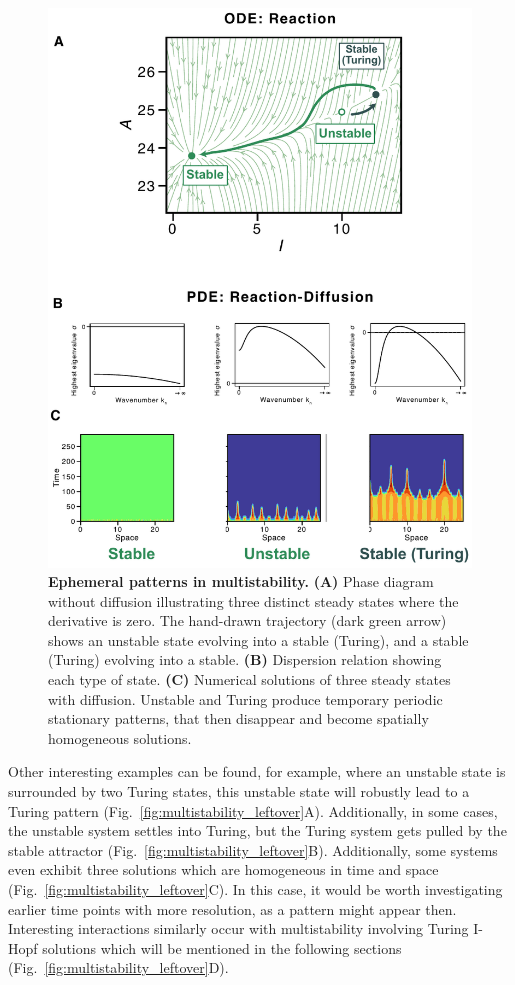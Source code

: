 \documentclass[10pt,letterpaper]{article}
\begin{document}
\begin{figure}[!h]
    \includegraphics[width=1\textwidth]{figures/multistability2}

    \caption{{\bf Ephemeral patterns in multistability.}
        \textbf{(A)} Phase diagram without diffusion illustrating three distinct steady states where the derivative is zero. The hand-drawn trajectory (dark green arrow) shows an unstable state evolving into a stable (Turing), and a stable (Turing) evolving into a stable. \textbf{(B)} Dispersion relation showing each type of state. \textbf{(C)} Numerical solutions of three steady states with diffusion. Unstable and Turing produce temporary periodic stationary patterns, that then disappear and become spatially homogeneous solutions.}
    \label{fig3}
\end{figure}



Other interesting examples can be found, for example, where an unstable state is surrounded by two Turing states, this unstable state will robustly lead to a Turing pattern (Fig.~\ref{fig:multistability_leftover}A).
Additionally, in some cases, the unstable system settles into Turing, but the Turing system gets pulled by the stable attractor (Fig.~\ref{fig:multistability_leftover}B). Additionally, some systems even exhibit three solutions which are homogeneous in time and space (Fig.~\ref{fig:multistability_leftover}C).
In this case, it would be worth investigating earlier time points with more resolution, as a pattern might appear then.
Interesting interactions similarly occur with multistability involving Turing I-Hopf solutions which will be mentioned in the following sections (Fig.~\ref{fig:multistability_leftover}D).
\end{document}
